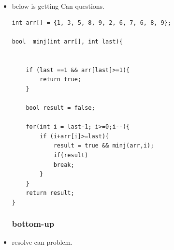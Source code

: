 \documentclass[a4paper,12pt,twoside]{book}
\begin{document}
\begin{itemize}
\begin{lstlisting}[numbers=none]
\end{lstlisting} 

\item below is getting Can questions.  
\begin{lstlisting}[numbers=none]
int arr[] = {1, 3, 5, 8, 9, 2, 6, 7, 6, 8, 9};

bool  minj(int arr[], int last){
	
	
	if (last ==1 && arr[last]>=1){
		return true;
	}
	
	bool result = false;
	
	for(int i = last-1; i>=0;i--){
		if (i+arr[i]>=last){
			result = true && minj(arr,i);
			if(result)
			break;
		}
	}
	return result;
}
\end{lstlisting} 

\subsubsection{bottom-up}
\item resolve can problem.

\end{itemize}
\end{document}
